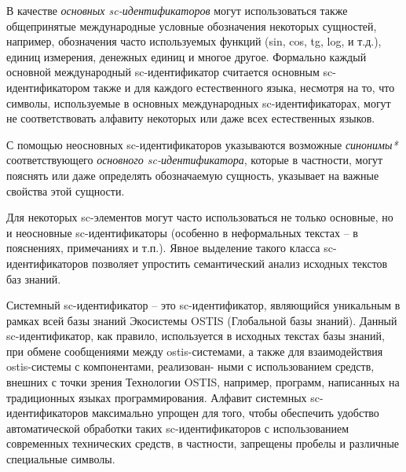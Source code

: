 В качестве \textit{основных sc-идентификаторов} могут использоваться также общепринятые международные условные обозначения некоторых сущностей, например, обозначения часто используемых функций (sin, cos, tg, log, и т.д.), единиц измерения, денежных единиц и многое другое. Формально каждый основной международный sc-идентификатор считается основным sc-идентификатором также и для каждого естественного языка, несмотря на то, что символы, используемые в основных международных sc-идентификаторах, могут не соответствовать алфавиту некоторых или даже всех естественных языков.

С помощью неосновных sc-идентификаторов указываются возможные \textit{синонимы*} соответствующего \textit{основного sc-идентификатора}, которые в частности, могут пояснять или даже определять обозначаемую сущность, указывает на важные свойства этой сущности.

Для некоторых sc-элементов могут часто использоваться не только основные, но и неосновные sc-идентификаторы (особенно в неформальных текстах -- в пояснениях, примечаниях и т.п.). Явное выделение такого класса sc-идентификаторов позволяет упростить семантический анализ исходных текстов баз знаний.


Системный sc-идентификатор – это sc-идентификатор, являющийся уникальным в рамках
всей базы знаний Экосистемы OSTIS (Глобальной базы знаний). Данный sc-идентификатор,
как правило, используется в исходных текстах базы знаний, при обмене сообщениями между
ostis-системами, а также для взаимодействия ostis-системы с компонентами, реализован-
ными с использованием средств, внешних с точки зрения Технологии OSTIS, например,
программ, написанных на традиционных языках программирования. Алфавит системных
sc-идентификаторов максимально упрощен для того, чтобы обеспечить удобство автоматической обработки таких sc-идентификаторов с использованием современных технических
средств, в частности, запрещены пробелы и различные специальные символы.


